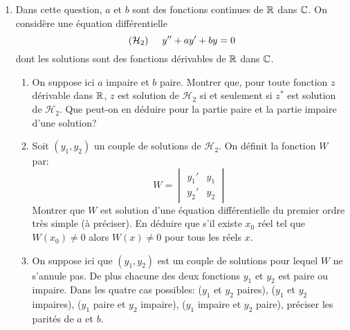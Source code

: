 \begin{enumerate}
 \item Dans cette question, $a$ et $b$ sont des fonctions continues de $\mathbb{R}$ dans $\mathbb{C}$. On considère une équation différentielle 
\[
 (\mathcal{H}_2)\hspace{0.5cm} y'' + a y' + by = 0
\]
dont les solutions sont des fonctions dérivables de $\mathbb{R}$ dans $\mathbb{C}$.
\begin{enumerate}
 \item On suppose ici $a$ impaire et $b$ paire.\newline
 Montrer que, pour toute fonction $z$ dérivable dans $\mathbb{R}$, $z$ est solution de $\mathcal{H}_2$ si et seulement si $z^*$ est solution de $\mathcal{H}_2$. Que peut-on en déduire pour la partie paire et la partie impaire d'une solution?

  \item Soit $(y_1,y_2)$ un couple de solutions de $\mathcal{H}_2$. On définit la fonction $W$ par:
\[
 W = 
\begin{vmatrix}
 y_1' & y_1 \\ y_2' & y_2
\end{vmatrix}
\]
Montrer que $W$ est solution d'une équation différentielle du premier ordre très simple (à préciser). En déduire que s'il existe $x_0$ réel tel que $W(x_0)\neq 0$ alors $W(x)\neq 0$ pour tous les réels $x$.

 \item On suppose ici que $(y_1,y_2)$ est un couple de solutions pour lequel $W$ ne s'annule pas. De plus chacune des deux fonctions $y_1$ et $y_2$ est paire ou impaire. Dans les quatre cas possibles: ($y_1$ et $y_2$ paires), ($y_1$ et $y_2$ impaires), ($y_1$ paire et $y_2$ impaire), ($y_1$ impaire et $y_2$ paire), préciser les parités de $a$ et $b$. 
\end{enumerate}



\end{enumerate}
